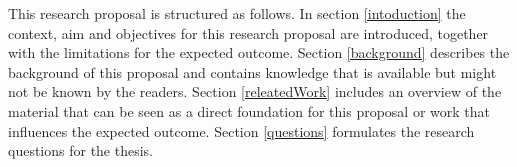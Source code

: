 
This research proposal is structured as follows. In section \ref{intoduction} the context, aim and objectives for this research proposal are introduced, together with the limitations for the expected outcome. Section \ref{background} describes the background of this proposal and contains knowledge that is available but might not be known by the readers. Section \ref{releatedWork} includes an overview of the material that can be seen as a direct foundation for this proposal or work that influences the expected outcome. Section \ref{questions} formulates the research questions for the thesis.